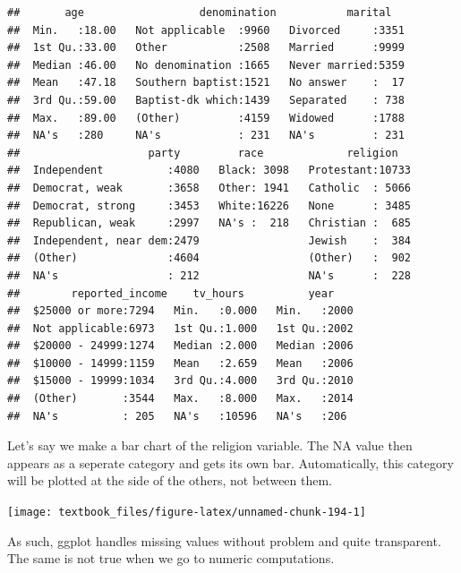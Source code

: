 \documentclass[]{tufte-book}
\newenvironment{Shaded}{}{}
\newcommand{\KeywordTok}[1]{\textcolor[rgb]{0.00,0.44,0.13}{\textbf{#1}}}
\newcommand{\NormalTok}[1]{#1}
\newcommand{\OperatorTok}[1]{\textcolor[rgb]{0.40,0.40,0.40}{#1}}
\newcommand{\StringTok}[1]{\textcolor[rgb]{0.25,0.44,0.63}{#1}}
\begin{document}
\begin{verbatim}
##       age                  denomination           marital    
##  Min.   :18.00   Not applicable  :9960   Divorced     :3351  
##  1st Qu.:33.00   Other           :2508   Married      :9999  
##  Median :46.00   No denomination :1665   Never married:5359  
##  Mean   :47.18   Southern baptist:1521   No answer    :  17  
##  3rd Qu.:59.00   Baptist-dk which:1439   Separated    : 738  
##  Max.   :89.00   (Other)         :4159   Widowed      :1788  
##  NA's   :280     NA's            : 231   NA's         : 231  
##                    party         race             religion    
##  Independent          :4080   Black: 3098   Protestant:10733  
##  Democrat, weak       :3658   Other: 1941   Catholic  : 5066  
##  Democrat, strong     :3453   White:16226   None      : 3485  
##  Republican, weak     :2997   NA's :  218   Christian :  685  
##  Independent, near dem:2479                 Jewish    :  384  
##  (Other)              :4604                 (Other)   :  902  
##  NA's                 : 212                 NA's      :  228  
##        reported_income    tv_hours          year     
##  $25000 or more:7294   Min.   :0.000   Min.   :2000  
##  Not applicable:6973   1st Qu.:1.000   1st Qu.:2002  
##  $20000 - 24999:1274   Median :2.000   Median :2006  
##  $10000 - 14999:1159   Mean   :2.659   Mean   :2006  
##  $15000 - 19999:1034   3rd Qu.:4.000   3rd Qu.:2010  
##  (Other)       :3544   Max.   :8.000   Max.   :2014  
##  NA's          : 205   NA's   :10596   NA's   :206
\end{verbatim}

Let's say we make a bar chart of the religion variable. The NA value then appears as a seperate category and gets its own bar. Automatically, this category will be plotted at the side of the others, not between them.

\begin{Shaded}
\end{Shaded}

\texttt{[image: textbook\_files/figure-latex/unnamed-chunk-194-1]}

As such, ggplot handles missing values without problem and quite transparent. The same is not true when we go to numeric computations.
\end{document}
